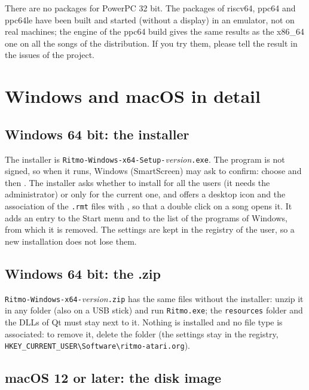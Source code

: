 \begin{note}
There are no packages for PowerPC 32 bit. The packages of riscv64, ppc64 and ppc64le have been built
and started (without a display) in an emulator, not on real machines; the engine of the ppc64 build gives the same results as the
x86\_64 one on all the songs of the distribution. If you try them, please tell the result in the issues of the project.
\end{note}

\section{Windows and macOS in detail}\label{sec:win-mac}

\subsection{Windows 64 bit: the installer}

The installer is \texttt{Ritmo-Windows-x64-Setup-}\emph{version}\texttt{.exe}. The program is not signed, so when it runs, Windows (SmartScreen) may ask to confirm: choose
 and then . The installer asks whether to install for all the users (it needs the
administrator) or only for the current one, and offers a desktop icon and the association of the \texttt{.rmt} files with
\RITMO{}, so that a double click on a song opens it. It adds an entry to the Start menu and to the list of the programs of Windows,
from which it is removed. The settings are kept in the registry of the user, so a new installation does not lose them.

\subsection{Windows 64 bit: the .zip}

\texttt{Ritmo-Windows-x64-}\emph{version}\texttt{.zip} has the same files without the installer: unzip it in any folder (also on a USB stick) and run
\texttt{Ritmo.exe}; the \texttt{resources} folder and the DLLs of Qt must stay next to it. Nothing is installed and no file type is
associated: to remove it, delete the folder (the settings stay in the registry, \texttt{HKEY\_CURRENT\_USER\textbackslash Software\textbackslash ritmo-atari.org}).

\subsection{macOS 12 or later: the disk image}

